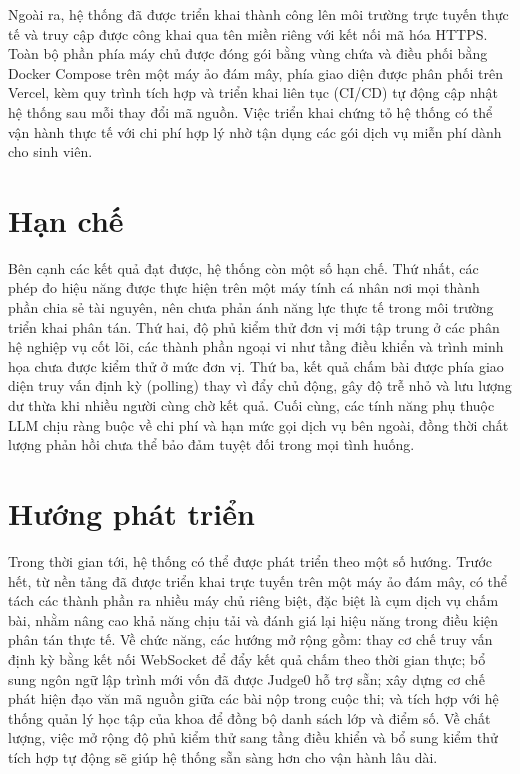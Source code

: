 \documentclass[12pt, a4paper]{report}
\begin{document}
Ngoài ra, hệ thống đã được triển khai thành công lên môi trường trực tuyến thực tế và truy
cập được công khai qua tên miền riêng với kết nối mã hóa \ac{HTTPS}. Toàn bộ phần phía máy
chủ được đóng gói bằng vùng chứa và điều phối bằng Docker Compose trên một máy ảo đám mây,
phía giao diện được phân phối trên Vercel, kèm quy trình tích hợp và triển khai liên tục
(\ac{CI/CD}) tự động cập nhật hệ thống sau mỗi thay đổi mã nguồn. Việc triển khai chứng tỏ
hệ thống có thể vận hành thực tế với chi phí hợp lý nhờ tận dụng các gói dịch vụ miễn phí
dành cho sinh viên.

\section{Hạn chế}

Bên cạnh các kết quả đạt được, hệ thống còn một số hạn chế. Thứ nhất, các phép đo hiệu
năng được thực hiện trên một máy tính cá nhân nơi mọi thành phần chia sẻ tài nguyên, nên
chưa phản ánh năng lực thực tế trong môi trường triển khai phân tán. Thứ hai, độ phủ kiểm
thử đơn vị mới tập trung ở các phân hệ nghiệp vụ cốt lõi, các thành phần ngoại vi như tầng
điều khiển và trình minh họa chưa được kiểm thử ở mức đơn vị. Thứ ba, kết quả chấm bài
được phía giao diện truy vấn định kỳ (polling) thay vì đẩy chủ động, gây độ trễ nhỏ và
lưu lượng dư thừa khi nhiều người cùng chờ kết quả. Cuối cùng, các tính năng phụ thuộc
\ac{LLM} chịu ràng buộc về chi phí và hạn mức gọi dịch vụ bên ngoài, đồng thời chất lượng
phản hồi chưa thể bảo đảm tuyệt đối trong mọi tình huống.

\section{Hướng phát triển}

Trong thời gian tới, hệ thống có thể được phát triển theo một số hướng. Trước hết, từ nền
tảng đã được triển khai trực tuyến trên một máy ảo đám mây, có thể tách các thành phần ra
nhiều máy chủ riêng biệt, đặc biệt là cụm dịch vụ chấm bài, nhằm nâng cao khả năng chịu tải
và đánh giá lại hiệu năng trong điều kiện phân tán thực tế. Về chức năng, các
hướng mở rộng gồm: thay cơ chế truy vấn định kỳ bằng kết nối WebSocket để đẩy kết quả chấm
theo thời gian thực; bổ sung ngôn ngữ lập trình mới vốn đã được Judge0 hỗ trợ sẵn; xây
dựng cơ chế phát hiện đạo văn mã nguồn giữa các bài nộp trong cuộc thi; và tích hợp với
hệ thống quản lý học tập của khoa để đồng bộ danh sách lớp và điểm số. Về chất
lượng, việc mở rộng độ phủ kiểm thử sang tầng điều khiển và bổ sung kiểm thử tích hợp tự
động sẽ giúp hệ thống sẵn sàng hơn cho vận hành lâu dài.

\newpage
\nocite{*}
\printbibliography[
  title   = {TÀI LIỆU THAM KHẢO},
  heading = bibintoc,
]
\end{document}
